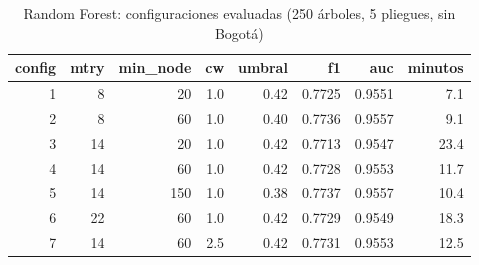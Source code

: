 \begin{table}[ht]
\centering
\begin{tabular}{rrrrrrrr}
  \hline
config & mtry & min\_node & cw & umbral & f1 & auc & minutos \\ 
  \hline
1 & 8 & 20 & 1.0 & 0.42 & 0.7725 & 0.9551 & 7.1 \\ 
  2 & 8 & 60 & 1.0 & 0.40 & 0.7736 & 0.9557 & 9.1 \\ 
  3 & 14 & 20 & 1.0 & 0.42 & 0.7713 & 0.9547 & 23.4 \\ 
  4 & 14 & 60 & 1.0 & 0.42 & 0.7728 & 0.9553 & 11.7 \\ 
  5 & 14 & 150 & 1.0 & 0.38 & 0.7737 & 0.9557 & 10.4 \\ 
  6 & 22 & 60 & 1.0 & 0.42 & 0.7729 & 0.9549 & 18.3 \\ 
  7 & 14 & 60 & 2.5 & 0.42 & 0.7731 & 0.9553 & 12.5 \\ 
   \hline
\end{tabular}
\caption{Random Forest: configuraciones evaluadas (250 árboles, 5 pliegues, sin Bogotá)} 
\end{table}
